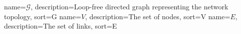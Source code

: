 {
    name=\(\mathcal{G}\),
    description={Loop-free directed graph representing the network topology},
    sort=G
}
{
    name=\(V\),
    description={The set of nodes},
    sort=V
}
{
    name=\(E\),
    description={The set of links},
    sort=E
}
